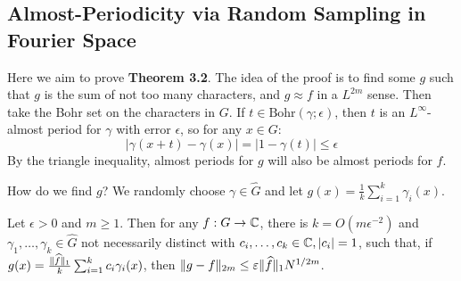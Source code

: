 \documentclass[10pt,a4paper]{article}
\begin{document}
\subsection{Almost-Periodicity via Random Sampling in Fourier Space}
Here we aim to prove \textbf{Theorem 3.2}. The idea of the proof is to find some $g$ such that $g$ is the sum of not too many characters, and $g \approx f$ in a $L^{2m}$ sense. Then take the Bohr set on the characters in $G$. If $t \in \text{Bohr}(\gamma; \epsilon)$, then $t$ is an $L^\infty$-almost period for $\gamma$ with error $\epsilon$, so for any $x \in G$:
\[|\gamma(x+t) - \gamma(x)| = |1-\gamma(t)| \leq \epsilon\]
By the triangle inequality, almost periods for $g$ will also be almost periods for $f$.

How do we find $g$? We randomly choose $\gamma \in \hat{G}$ and let $g(x) = \frac{1}{k}\sum_{i=1}^k \gamma_i(x)$.
\begin{lemma}
  Let $\epsilon > 0$ and $m \geq 1$. Then for any $f: G \to \mathbb{C}$, there is $k = O(m\epsilon^{-2})$ and $\gamma_1, \ldots, \gamma_k \in \hat{G}$ not necessarily distinct with $c_i, \ldots, c_k \in \mathbb{C}, |c_i| = 1$, such that, if $g(x) = \frac{\lVert\widehat{f}\rVert_1}{k} \sum_{i=1}^k c_i \gamma_i(x)$, then $\lVert g-f\rVert_{2m} \leq \varepsilon \lVert\widehat{f}\rVert_1 N^{1/2m}$.
\end{lemma}
\end{document}
